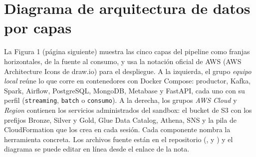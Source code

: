 \documentclass[12pt,letterpaper]{article}
\newcommand{\code}[1]{{\small\texttt{#1}}}
\begin{document}
\section{Diagrama de arquitectura de datos por capas}

La Figura 1 (página siguiente) muestra las cinco capas del pipeline como franjas horizontales, de la fuente al consumo, y usa la notación oficial de AWS (AWS Architecture Icons de draw.io) para el despliegue. A la izquierda, el grupo \emph{equipo local} reúne lo que corre en contenedores con Docker Compose: productor, Kafka, Spark, Airflow, PostgreSQL, MongoDB, Metabase y FastAPI, cada uno con su perfil (\code{streaming}, \code{batch} o \code{consumo}). A la derecha, los grupos \emph{AWS Cloud} y \emph{Region} contienen los servicios administrados del sandbox: el bucket de S3 con los prefijos Bronze, Silver y Gold, Glue Data Catalog, Athena, SNS y la pila de CloudFormation que los crea en cada sesión. Cada componente nombra la herramienta concreta. Los archivos fuente están en el repositorio (,  y ) y el diagrama se puede editar en línea desde el enlace de la nota.
\end{document}
